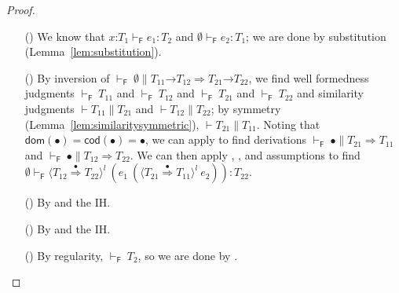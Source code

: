 \documentclass[9pt]{extarticle}
\newcommand{\ottnt}[1]{\mathit{#1}}
\begin{document}
{\begin{lemma}
\begin{proof}
{\begin{itemize}
\begin{itemize}
      \item[(\E{Beta})] We know that $  \mathit{x} \mathord{:} \ottnt{T_{{\mathrm{1}}}}    \vdash _{  \mathsf{F}  }  \ottnt{e_{{\mathrm{1}}}}  :  \ottnt{T_{{\mathrm{2}}}} $ and
        $ \emptyset   \vdash _{  \mathsf{F}  }  \ottnt{e_{{\mathrm{2}}}}  :  \ottnt{T_{{\mathrm{1}}}} $; we are done by substitution
        (Lemma~\ref{lem:substitution}).
      \item[(\E{Unwrap})] By inversion of $ \mathord{  \vdash _{  \mathsf{F}  } }~ \emptyset   \mathrel{\parallel}    \ottnt{T_{{\mathrm{11}}}} \mathord{ \rightarrow } \ottnt{T_{{\mathrm{12}}}}   \Rightarrow   \ottnt{T_{{\mathrm{21}}}} \mathord{ \rightarrow } \ottnt{T_{{\mathrm{22}}}}  $, we find well formedness judgments $ \mathord{  \vdash _{  \mathsf{F}  } }~ \ottnt{T_{{\mathrm{11}}}} $
        and $ \mathord{  \vdash _{  \mathsf{F}  } }~ \ottnt{T_{{\mathrm{12}}}} $ and $ \mathord{  \vdash _{  \mathsf{F}  } }~ \ottnt{T_{{\mathrm{21}}}} $ and $ \mathord{  \vdash _{  \mathsf{F}  } }~ \ottnt{T_{{\mathrm{22}}}} $ and
        similarity judgments $\vdash  \ottnt{T_{{\mathrm{11}}}}  \mathrel{\parallel}  \ottnt{T_{{\mathrm{21}}}}$ and $\vdash  \ottnt{T_{{\mathrm{12}}}}  \mathrel{\parallel}  \ottnt{T_{{\mathrm{22}}}}$; by symmetry (Lemma~\ref{lem:similaritysymmetric}),
        $\vdash  \ottnt{T_{{\mathrm{21}}}}  \mathrel{\parallel}  \ottnt{T_{{\mathrm{11}}}}$. Noting that $ \mathsf{dom} ( \bullet )  =  \mathsf{cod} ( \bullet )  =
         \bullet $, we can apply  to find derivations
        $ \mathord{  \vdash _{  \mathsf{F}  } }~ \bullet   \mathrel{\parallel}   \ottnt{T_{{\mathrm{21}}}}  \Rightarrow  \ottnt{T_{{\mathrm{11}}}} $ and $ \mathord{  \vdash _{  \mathsf{F}  } }~ \bullet   \mathrel{\parallel}   \ottnt{T_{{\mathrm{12}}}}  \Rightarrow  \ottnt{T_{{\mathrm{22}}}} $. We can then apply , , and
        assumptions to find $ \emptyset   \vdash _{  \mathsf{F}  }   \langle  \ottnt{T_{{\mathrm{12}}}}  \mathord{ \overset{\bullet}{\Rightarrow} }  \ottnt{T_{{\mathrm{22}}}}  \rangle^{ \ottnt{l} } ~   (  \ottnt{e_{{\mathrm{1}}}} ~  (  \langle  \ottnt{T_{{\mathrm{21}}}}  \mathord{ \overset{\bullet}{\Rightarrow} }  \ottnt{T_{{\mathrm{11}}}}  \rangle^{ \ottnt{l} } ~  \ottnt{e_{{\mathrm{2}}}}  )   )    :  \ottnt{T_{{\mathrm{22}}}} $.
      \item[(\E{AppL})] By  and the IH.
      \item[(\E{AppR})] By  and the IH.
      \item[(\E{AppRaiseL})] By regularity, $ \mathord{  \vdash _{  \mathsf{F}  } }~ \ottnt{T_{{\mathrm{2}}}} $, so we are done by .

\end{itemize}
\end{itemize}}
\end{proof}
\end{lemma}}
\end{document}
